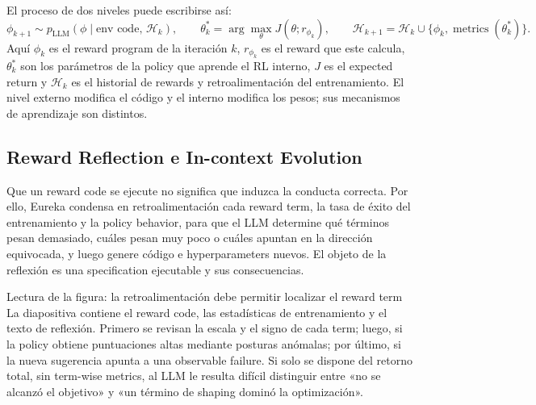 El proceso de dos niveles puede escribirse así:
\[
\phi_{k+1}\sim p_{\mathrm{LLM}}(\phi\mid \text{env code},\,\mathcal{H}_k),
\qquad
\theta_k^*=\arg\max_\theta J(\theta; r_{\phi_k}),
\qquad
\mathcal{H}_{k+1}=\mathcal{H}_k\cup\{\phi_k,\operatorname{metrics}(\theta_k^*)\}.
\]
Aquí $\phi_k$ es el reward program de la iteración $k$, $r_{\phi_k}$ es el reward que este calcula, $\theta_k^*$ son los parámetros de la policy que aprende el RL interno, $J$ es el expected return y $\mathcal{H}_k$ es el historial de rewards y retroalimentación del entrenamiento. El nivel externo modifica el código y el interno modifica los pesos; sus mecanismos de aprendizaje son distintos.


\subsection{Reward Reflection e In-context Evolution}

Que un reward code se ejecute no significa que induzca la conducta correcta. Por ello, Eureka condensa en retroalimentación cada reward term, la tasa de éxito del entrenamiento y la policy behavior, para que el LLM determine qué términos pesan demasiado, cuáles pesan muy poco o cuáles apuntan en la dirección equivocada, y luego genere código e hyperparameters nuevos. El objeto de la reflexión es una specification ejecutable y sus consecuencias.


\begin{knowledgebox}{Lectura de la figura: la retroalimentación debe permitir localizar el reward term}
La diapositiva contiene el reward code, las estadísticas de entrenamiento y el texto de reflexión. Primero se revisan la escala y el signo de cada term; luego, si la policy obtiene puntuaciones altas mediante posturas anómalas; por último, si la nueva sugerencia apunta a una observable failure. Si solo se dispone del retorno total, sin term-wise metrics, al LLM le resulta difícil distinguir entre «no se alcanzó el objetivo» y «un término de shaping dominó la optimización».
\end{knowledgebox}

